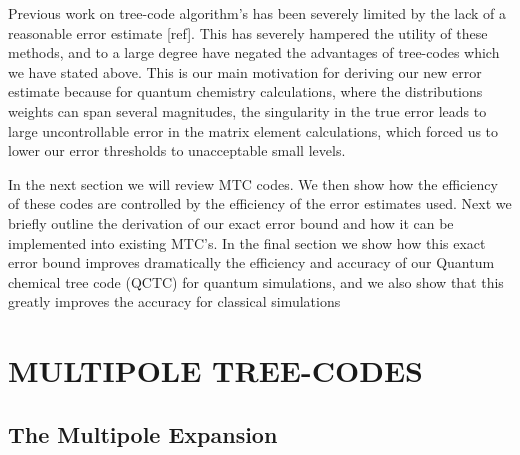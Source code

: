\documentclass[prb,aps,nobibnotes,superbib,preprint]{revtex4}
\begin{document}
Previous work on tree-code algorithm's has been severely limited by the lack of
a reasonable error estimate [ref]. 
This has severely hampered the utility of these methods, and to a large degree have negated the advantages
of tree-codes which we have stated above.
This is our main motivation for deriving our new error estimate because for quantum chemistry calculations, 
where the distributions weights can span several magnitudes, the singularity in the true error
leads to large uncontrollable error in the matrix element calculations, which forced us to lower our error 
thresholds to unacceptable small levels. 

In the next section we will review MTC codes. We then show how the efficiency of these codes are
controlled by the efficiency of the error estimates used. Next we briefly outline the derivation of 
our exact error bound and how it can be implemented into existing MTC's. In the final
section we show how this exact error bound improves dramatically the efficiency and accuracy
of our Quantum chemical tree code (QCTC) for quantum simulations, and we also show that this
greatly improves the accuracy for classical simulations


\section{MULTIPOLE TREE-CODES}

\subsection{The Multipole Expansion}
\end{document}
